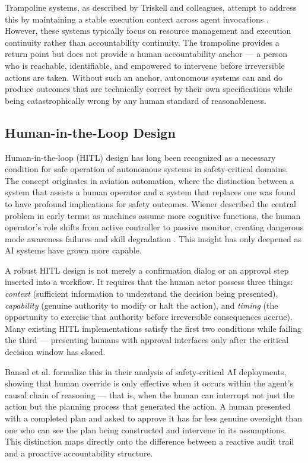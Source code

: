 Trampoline systems, as described by Triskell and colleagues, attempt to address this by maintaining a stable execution context across agent invocations \cite{tristr81}. However, these systems typically focus on resource management and execution continuity rather than accountability continuity. The trampoline provides a return point but does not provide a human accountability anchor — a person who is reachable, identifiable, and empowered to intervene before irreversible actions are taken. Without such an anchor, autonomous systems can and do produce outcomes that are technically correct by their own specifications while being catastrophically wrong by any human standard of reasonableness.

\subsection{Human-in-the-Loop Design}

Human-in-the-loop (HITL) design has long been recognized as a necessary condition for safe operation of autonomous systems in safety-critical domains. The concept originates in aviation automation, where the distinction between a system that assists a human operator and a system that replaces one was found to have profound implications for safety outcomes. Wiener described the central problem in early terms: as machines assume more cognitive functions, the human operator's role shifts from active controller to passive monitor, creating dangerous mode awareness failures and skill degradation \cite{wiener1948}. This insight has only deepened as AI systems have grown more capable.

A robust HITL design is not merely a confirmation dialog or an approval step inserted into a workflow. It requires that the human actor possess three things: \emph{context} (sufficient information to understand the decision being presented), \emph{capability} (genuine authority to modify or halt the action), and \emph{timing} (the opportunity to exercise that authority before irreversible consequences accrue). Many existing HITL implementations satisfy the first two conditions while failing the third — presenting humans with approval interfaces only after the critical decision window has closed.

Bansal et al. \cite{bansal2019} formalize this in their analysis of safety-critical AI deployments, showing that human override is only effective when it occurs within the agent's causal chain of reasoning — that is, when the human can interrupt not just the action but the planning process that generated the action. A human presented with a completed plan and asked to approve it has far less genuine oversight than one who can see the plan being constructed and intervene in its assumptions. This distinction maps directly onto the difference between a reactive audit trail and a proactive accountability structure.

